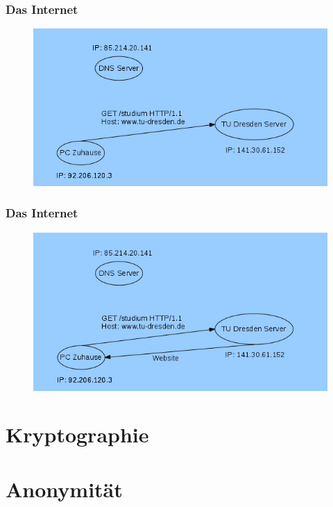 \documentclass[12pt]{beamer}
\begin{document}
\begin{frame}
  \frametitle{Das Internet}
  \begin{figure}
    \includegraphics[height=0.7\textheight]{img/internetstruktur-4.png}
  \end{figure}
\end{frame}

\begin{frame}
  \frametitle{Das Internet}
  \begin{figure}
    \includegraphics[height=0.7\textheight]{img/internetstruktur-5.png}
  \end{figure}
\end{frame}

\section{Kryptographie}
\subsection{}

\section{Anonymität}
\end{document}
